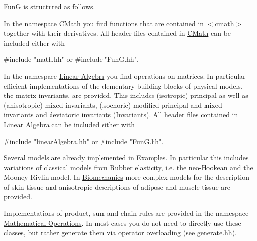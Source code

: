 Fun\-G is structured as follows.


\begin{DoxyItemize}
\item In the namespace \hyperlink{group__CMathGroup}{C\-Math} you find functions that are contained in {\ttfamily $<$cmath$>$} together with their derivatives. All header files contained in \hyperlink{group__CMathGroup}{C\-Math} can be included either with 
\begin{DoxyPre}{\ttfamily #include "math.hh"} or {\ttfamily #include "FunG.hh"}.\end{DoxyPre}

\item In the namespace \hyperlink{group__LinearAlgebraGroup}{Linear Algebra} you find operations on matrices. In particular efficient implementations of the elementary building blocks of physical models, the matrix invariants, are provided. This includes (isotropic) principal as well as (anisotropic) mixed invariants, (isochoric) modified principal and mixed invariants and deviatoric invariants (\hyperlink{group__InvariantGroup}{Invariants}). All header files contained in \hyperlink{group__LinearAlgebraGroup}{Linear Algebra} can be included either with 
\begin{DoxyPre}{\ttfamily #include "linearAlgebra.hh"} or {\ttfamily #include "FunG.hh"}.\end{DoxyPre}

\item Several models are already implemented in \hyperlink{group__Examples}{Examples}. In particular this includes variations of classical models from \hyperlink{group__Rubber}{Rubber} elasticity, i.\-e. the neo-\/\-Hookean and the Mooney-\/\-Rivlin model. In \hyperlink{group__Biomechanics}{Biomechanics} more complex models for the description of skin tissue and anisotropic descriptions of adipose and muscle tissue are provided.
\item Implementations of product, sum and chain rules are provided in the namespace \hyperlink{group__MathematicalOperationsGroup}{Mathematical Operations}. In most cases you do not need to directly use these classes, but rather generate them via operator overloading (see \hyperlink{generate_8hh_source}{generate.\-hh}). 
\end{DoxyItemize}